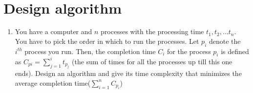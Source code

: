 \documentclass{article}
\begin{document}
\section{Design algorithm}
\begin{enumerate}
    \item You have a computer and $n$ processes with the processing time $t_1,t_2,\dots t_n$. You have to pick the order in which to run the processes. Let $p_i$ denote the $i^{th}$ process you run. Then, the completion time $C_i$ for the process $p_i$ is defined as $C_{pi}=\sum_{j=1}^{i} t_{p_j}$ (the sum of times for all the processes up till this one ends). Design an algorithm and give its time complexity that minimizes the average completion time($\sum_{i=1}^{n} C_{p_i}$)
    \newpage
    
\end{enumerate}
\end{document}
